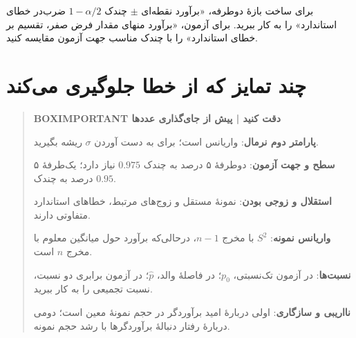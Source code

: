 برای ساخت بازهٔ دوطرفه، «برآورد نقطه‌ای $\pm$ چندک $1-\alpha/2$ ضرب‌در خطای استاندارد» را به کار ببرید. برای آزمون، «برآورد منهای مقدار فرض صفر، تقسیم بر خطای استاندارد» را با چندک مناسب جهت آزمون مقایسه کنید.
\section{چند تمایز که از خطا جلوگیری می‌کند}
\begin{quote}\textbf{BOXIMPORTANT دقت کنید | پیش از جای‌گذاری عددها}\par 
\textbf{پارامتر دوم نرمال}: واریانس است؛ برای به دست آوردن $\sigma$ ریشه بگیرید.

\textbf{سطح و جهت آزمون}: دوطرفهٔ ۵ درصد به چندک $0.975$ نیاز دارد؛ یک‌طرفهٔ ۵ درصد به چندک $0.95$.

\textbf{استقلال و زوجی بودن}: نمونهٔ مستقل و زوج‌های مرتبط، خطاهای استاندارد متفاوتی دارند.

\textbf{واریانس نمونه}: $S^2$ با مخرج $n-1$، درحالی‌که برآورد حول میانگین معلوم با مخرج $n$ است.

\textbf{نسبت‌ها}: در آزمون تک‌نسبتی، $p_0$؛ در فاصلهٔ والد، $\widehat p$؛ در آزمون برابری دو نسبت، نسبت تجمیعی را به کار ببرید.

\textbf{نااریبی و سازگاری}: اولی دربارهٔ امید برآوردگر در حجم نمونهٔ معین است؛ دومی دربارهٔ رفتار دنبالهٔ برآوردگرها با رشد حجم نمونه.
\end{quote}

